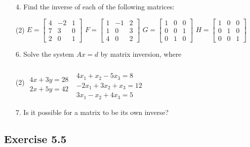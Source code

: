 \documentclass{./../../Latex/homework}
\begin{document}
\begin{enumerate}
\item[4.] Find the inverse of each of the following matrices:
\begin{tasks}(2)
\task $E=\left[\begin{array}{rrr}4 & -2 & 1 \\ 7 & 3 & 0 \\ 2 & 0 & 1\end{array}\right]$
\task $F=\left[\begin{array}{rrr}1 & -1 & 2 \\ 1 & 0 & 3 \\ 4 & 0 & 2\end{array}\right]$
\task $G=\left[\begin{array}{lll}1 & 0 & 0 \\ 0 & 0 & 1 \\ 0 & 1 & 0\end{array}\right]$
\task $H=\left[\begin{array}{lll}1 & 0 & 0 \\ 0 & 1 & 0 \\ 0 & 0 & 1\end{array}\right]$
\end{tasks} 

\item[6.] Solve the system $A x=d$ by matrix inversion, where
\vspace{-1.25cm}
\begin{tasks}(2)
\task  $\begin{aligned} \\
	4 x+3 y=28 \\
	2 x+5 y=42
\end{aligned}$
\task $\begin{aligned} \\~\\
	4 x_{1}+x_{2}-5 x_{3}=8 \\
	-2 x_{1}+3 x_{2}+x_{3}=12 \\
	3 x_{1}-x_{2}+4 x_{3}=5
\end{aligned}$
\end{tasks} 


\item[7.] Is it possible for a matrix to be its own inverse?

\end{enumerate}


\subsection*{Exercise 5.5}
\end{document}
